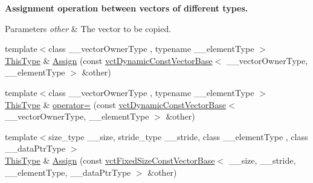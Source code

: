 \begin{Indent}{\bf Assignment operation between vectors of different types.}\par
{\em 
\begin{DoxyParams}{Parameters}
{\em other} & The vector to be copied. \\
\hline
\end{DoxyParams}
}\begin{DoxyCompactItemize}
\item 
{\footnotesize template$<$class \-\_\-\-\_\-vector\-Owner\-Type , typename \-\_\-\-\_\-element\-Type $>$ }\\\hyperlink{classvct_dynamic_const_vector_base_a39da273523717f678f54d3321ebca3dd}{This\-Type} \& \hyperlink{classvct_dynamic_vector_base_ad4afb1dd8544f91213679e148f8aa890}{Assign} (const \hyperlink{classvct_dynamic_const_vector_base}{vct\-Dynamic\-Const\-Vector\-Base}$<$ \-\_\-\-\_\-vector\-Owner\-Type, \-\_\-\-\_\-element\-Type $>$ \&other)
\item 
{\footnotesize template$<$class \-\_\-\-\_\-vector\-Owner\-Type , typename \-\_\-\-\_\-element\-Type $>$ }\\\hyperlink{classvct_dynamic_const_vector_base_a39da273523717f678f54d3321ebca3dd}{This\-Type} \& \hyperlink{classvct_dynamic_vector_base_a14b5a93889a05a9d29814b269e6df95e}{operator=} (const \hyperlink{classvct_dynamic_const_vector_base}{vct\-Dynamic\-Const\-Vector\-Base}$<$ \-\_\-\-\_\-vector\-Owner\-Type, \-\_\-\-\_\-element\-Type $>$ \&other)
\item 
{\footnotesize template$<$size\-\_\-type \-\_\-\-\_\-size, stride\-\_\-type \-\_\-\-\_\-stride, class \-\_\-\-\_\-element\-Type , class \-\_\-\-\_\-data\-Ptr\-Type $>$ }\\\hyperlink{classvct_dynamic_const_vector_base_a39da273523717f678f54d3321ebca3dd}{This\-Type} \& \hyperlink{classvct_dynamic_vector_base_a92c5dd44b7b9e737312706c0ba69870b}{Assign} (const \hyperlink{classvct_fixed_size_const_vector_base}{vct\-Fixed\-Size\-Const\-Vector\-Base}$<$ \-\_\-\-\_\-size, \-\_\-\-\_\-stride, \-\_\-\-\_\-element\-Type, \-\_\-\-\_\-data\-Ptr\-Type $>$ \&other)
\end{DoxyCompactItemize}
\end{Indent}
